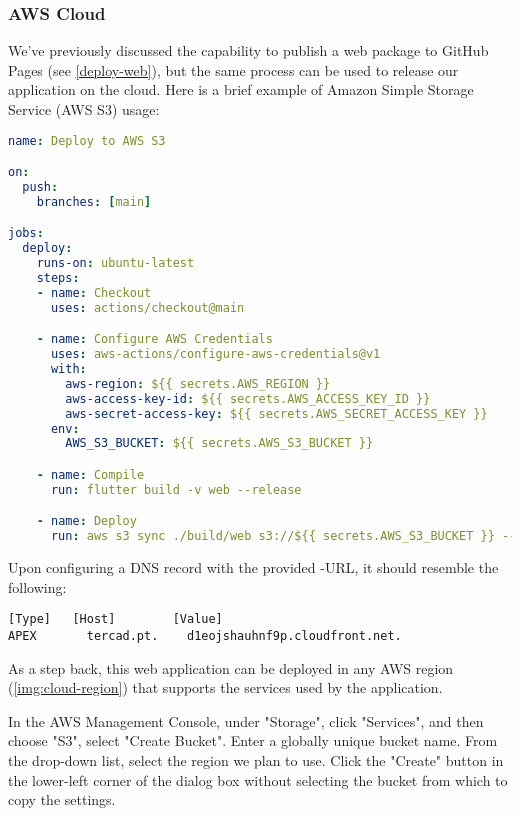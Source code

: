 
\subsubsection{AWS Cloud}

We've previously discussed the capability to publish a web package to GitHub Pages (see \ref{deploy-web}), but the same process can be used to release our application on the cloud. Here is a brief example of Amazon Simple Storage Service (AWS S3) usage:

\begin{lstlisting}[language=yaml]
name: Deploy to AWS S3

on: 
  push:
    branches: [main]

jobs:
  deploy:
    runs-on: ubuntu-latest
    steps:
    - name: Checkout
      uses: actions/checkout@main

    - name: Configure AWS Credentials
      uses: aws-actions/configure-aws-credentials@v1
      with:
        aws-region: ${{ secrets.AWS_REGION }}
        aws-access-key-id: ${{ secrets.AWS_ACCESS_KEY_ID }}
        aws-secret-access-key: ${{ secrets.AWS_SECRET_ACCESS_KEY }}
      env:
        AWS_S3_BUCKET: ${{ secrets.AWS_S3_BUCKET }}

    - name: Compile
      run: flutter build -v web --release

    - name: Deploy
      run: aws s3 sync ./build/web s3://${{ secrets.AWS_S3_BUCKET }} --delete
\end{lstlisting}

\noindent Upon configuring a DNS record with the provided -URL, it should resemble the following:

\begin{lstlisting}[language=terminal]
[Type]	 [Host]        [Value]
APEX	   tercad.pt.    d1eojshauhnf9p.cloudfront.net.
\end{lstlisting}

\noindent As a step back, this web application can be deployed in any AWS region (\cref{img:cloud-region}) that supports 
the services used by the application.


In the AWS Management Console, under "Storage", click "Services", and then choose "S3", select "Create Bucket".
Enter a globally unique bucket name. From the drop-down list, select the region we plan to use. Click the "Create" 
button in the lower-left corner of the dialog box without selecting the bucket from which to copy the settings.


